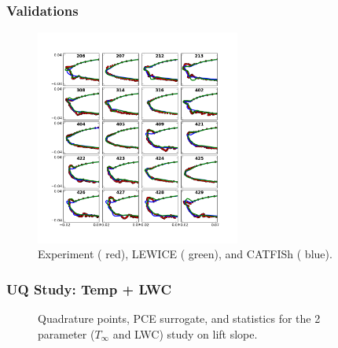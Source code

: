 \documentclass[9pt]{beamer}
\begin{document}
\begin{frame}
\frametitle{Validations}
\label{sec-4-6}

\vspace*{-0.5cm}
\begin{figure}[ht]
  \centering
  \includegraphics[trim=0.625in 0.75in 0.83in 0.8in,clip,width=0.6\textwidth]{IceShapeValidations.png}
  \caption{Experiment ({\color{red} red}), LEWICE ({\color{green} green}), and CATFISh ({\color{blue} blue}).}
\end{figure}
\end{frame}
\begin{frame}
\frametitle{UQ Study: Temp + LWC}
\label{sec-4-7}

\begin{figure}[ht]
\centering
{}
\caption{Quadrature points, PCE surrogate, and statistics for the 2 parameter ($T_{\infty}$ and LWC) study on lift slope.}
\end{figure}
\end{frame}
\end{document}
